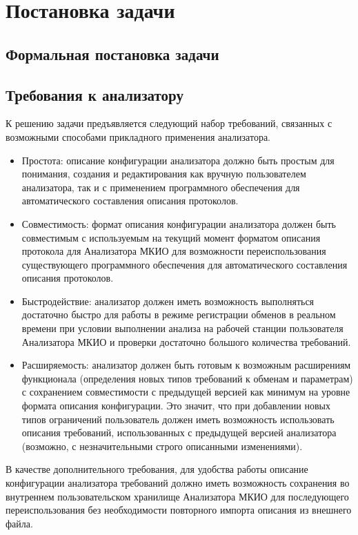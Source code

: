 \section{Постановка задачи}

\subsection{Формальная постановка задачи}

\subsection{Требования к анализатору}

К решению задачи предъявляется следующий набор требований, связанных с 
возможными способами прикладного применения анализатора.

\begin{itemize}
 \item Простота: описание конфигурации анализатора должно быть простым для 
понимания, создания и редактирования как вручную пользователем анализатора, так 
и с применением программного обеспечения для автоматического составления 
описания протоколов.
 \item Совместимость: формат описания конфигурации анализатора должен быть 
совместимым с 
используемым на текущий момент форматом описания протокола для Анализатора 
МКИО для возможности переиспользования существующего программного обеспечения 
для автоматического составления описания протоколов.
 \item Быстродействие: анализатор должен иметь возможность выполняться 
достаточно быстро для работы в режиме регистрации обменов в реальном времени при 
условии выполнении анализа на рабочей станции пользователя Анализатора МКИО и 
проверки достаточно большого количества требований.
 \item Расширяемость: анализатор должен быть готовым к возможным расширениям 
функционала (определения новых типов требований к обменам и параметрам) с 
сохранением совместимости с предыдущей версией как минимум на уровне формата 
описания конфигурации. Это значит, что при добавлении новых типов ограничений 
пользователь должен иметь возможность использовать описания требований, 
использованных с предыдущей версией анализатора (возможно, с незначительными 
строго описанными изменениями).
\end{itemize}

В качестве дополнительного требования, для удобства работы описание 
конфигурации анализатора требований должно иметь возможность сохранения во 
внутреннем пользовательском хранилище Анализатора МКИО для последующего 
переиспользования без необходимости повторного импорта описания из внешнего 
файла.

